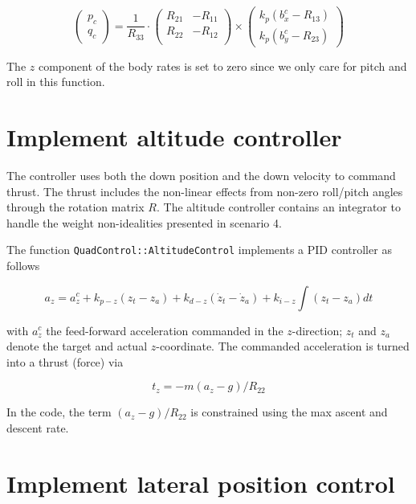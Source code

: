 \documentclass[12pt]{article}
\begin{document}
$$\left(\begin{array}{c} p_c \\ q_c\end{array} \right) = \frac{1}{R_{33}} \cdot \left(
                                 \begin{array}{cc}
                                   R_{21} & -R_{11} \\
                                   R_{22} & -R_{12} \\
                                 \end{array}
                               \right) \times
                                \left(\begin{array}{c}
                                  k_p(b_x^c - R_{13}) \\
                                  k_p(b_y^c - R_{23})
                                \end{array}
                                \right)$$

The $z$ component of the body rates is set to zero since we only care for pitch and roll in this function.


\section{Implement altitude controller}

The controller uses both the down position and the down velocity to command thrust. The thrust includes the non-linear effects from non-zero roll/pitch angles through the rotation matrix $R$. The altitude controller contains an integrator to handle the weight non-idealities presented in scenario 4.

The function \verb+QuadControl::AltitudeControl+ implements a PID controller as follows

$$a_z = a_z^c + k_{p-z} (z_t-z_a) + k_{d-z}(\dot z_t - \dot z_a) + k_{i-z}\int (z_t - z_a) dt$$

with $a_z^c$ the feed-forward acceleration commanded in the $z$-direction; $z_t$ and $z_a$ denote the target and actual $z$-coordinate.
The commanded acceleration is turned into a thrust (force) via

$$t_z = - m(a_z - g)/R_{22}$$

In the code, the term $(a_z - g)/R_{22}$ is constrained using the max ascent and descent rate.

\section{Implement lateral position control}
\end{document}
